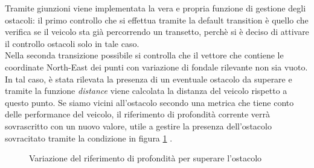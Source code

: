 \documentclass{article}
\begin{document}
            Tramite giunzioni viene implementata la vera e propria funzione di gestione degli ostacoli: il primo controllo che si effettua tramite la default
            transition è quello che verifica se il veicolo sta già percorrendo un transetto, perchè si è deciso di attivare il controllo ostacoli solo in tale caso.\\
            Nella seconda transizione possibile si controlla che il vettore che contiene le coordinate North-East 
            dei punti con variazione di fondale rilevante non sia vuoto. In tal caso, è stata rilevata la presenza di un eventuale ostacolo da superare
            e tramite la funzione \emph{distance}
            viene calcolata la 
            distanza del veicolo rispetto a questo punto. Se siamo vicini all'ostacolo secondo una metrica che tiene conto delle performance del veicolo, il riferimento di profondità
            corrente verrà sovrascritto con un nuovo valore, utile a gestire la presenza dell'ostacolo sovracitato tramite la condizione in figura \ref{fig:ccond} .

            \begin{figure} [ht]
                \caption{Variazione del riferimento di profondità per superare l'ostacolo}
                \label{fig:ccond}
            \end{figure}
\end{document}
